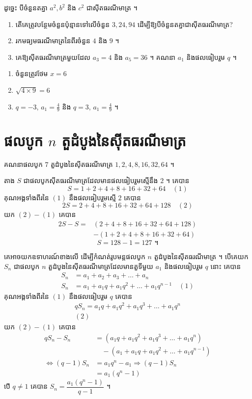 ដូច្នេះ បីចំនួនតគ្នា $a^2, b^2$ និង $c^2$ ជាស៊ីតធរណីមាត្រ ។

\begin{pro}
\begin{enumerate}[a]
  \item តើគេត្រូវបន្ថែមចំនួនប៉ុន្មានទៅលើចំនួន $3, 24, 94$ ដើម្បីឱ្យបីចំនួនតគ្នាជាស៊ីតធរណីមាត្រ?
  \item រកមធ្យមធរណីមាត្រនៃពីរចំនួន $4$ និង $9$ ។
  \item គេឱ្យស៊ីតធរណីមាត្រមួយដែល $a_3 = 4$ និង $a_5 = 36$ ។ គណនា $a_1$ និងផលធៀបរួម $q$ ។
\end{enumerate}
\ans
\begin{enumerate}[a]
  \item ចំនួនត្រូវថែម $x = 6$
  \item $\sqrt{4 \times 9} = 6$
  \item $q = -3$, $a_1 = \frac{4}{9}$ និង $q = 3$, $a_1 = \frac{4}{9}$ ។
\end{enumerate}
\end{pro}

\section{ផលបូក \texorpdfstring{$n$}{n} តួដំបូងនៃស៊ីតធរណីមាត្រ}

\begin{example}[ឧទាហរណ៍]
គណនាផលបូក $7$ តួដំបូងនៃស៊ីតធរណីមាត្រ $1, 2, 4, 8, 16, 32, 64$ ។

តាង $S$ ជាផលបូកស៊ីតធរណីមាត្រដែលមានផលធៀបរួមស្មើនឹង $2$ ។ គេបាន
\[ S = 1 + 2 + 4 + 8 + 16 + 32 + 64 \quad (1) \]
គុណអង្គទាំងពីរនៃ $(1)$ នឹងផលធៀបរួមស្មើ $2$ គេបាន
\[ 2S = 2 + 4 + 8 + 16 + 32 + 64 + 128 \quad (2) \]
យក $(2) - (1)$ គេបាន
\[ \begin{aligned} 2S - S = {}&(2 + 4 + 8 + 16 + 32 + 64 + 128)\\ &- (1 + 2 + 4 + 8 + 16 + 32 + 64) \end{aligned} \]
\[ S = 128 - 1 = 127 \text{ ។} \]
\end{example}

គេអាចយកឧទាហរណ៍ខាងលើ ដើម្បីកំណត់រូបមន្តផលបូក $n$ តួដំបូងនៃស៊ីតធរណីមាត្រ ។ បើគេយក $S_n$ ជាផលបូក $n$ តួដំបូងនៃស៊ីតធរណីមាត្រដែលមានតួទីមួយ $a_1$ និងផលធៀបរួម $q$ នោះ គេបាន
\[
\begin{aligned}
S_n &= a_1 + a_2 + a_3 + \ldots + a_n\\
S_n &= a_1 + a_1 q + a_1 q^2 + \ldots + a_1 q^{n-1} \quad (1)
\end{aligned}
\]
គុណអង្គទាំងពីរនៃ $(1)$ នឹងផលធៀបរួម $q$ គេបាន
\[
\begin{gathered}
qS_n = a_1 q + a_1 q^2 + a_1 q^3 + \ldots + a_1 q^n\\
(2)
\end{gathered}
\]
យក $(2) - (1)$ គេបាន
\[
\begin{aligned}
qS_n - S_n &= (a_1 q + a_1 q^2 + a_1 q^3 + \ldots + a_1 q^n)\\
&\quad - (a_1 + a_1 q + a_1 q^2 + \ldots + a_1 q^{n-1})\\
\iff (q - 1)S_n &= a_1 q^n - a_1 \Rightarrow (q - 1)S_n\\
&= a_1(q^n - 1)
\end{aligned}
\]
បើ $q \ne 1$ គេបាន $S_n = \dfrac{a_1(q^n - 1)}{q - 1}$ ។

